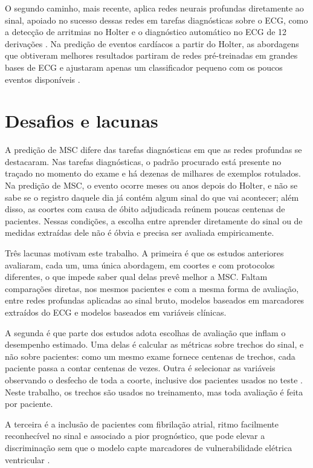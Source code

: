 O segundo caminho, mais recente, aplica redes neurais profundas diretamente
ao sinal, apoiado no sucesso dessas redes em tarefas diagnósticas sobre o
\gls{ECG}, como a detecção de arritmias no Holter
\cite{hannun2019cardiologist} e o diagnóstico automático no \gls{ECG} de 12
derivações \cite{ribeiro2020automatic}. Na predição de eventos cardíacos a
partir do Holter, as abordagens que obtiveram melhores resultados partiram
de redes pré-treinadas em grandes bases de \gls{ECG} e ajustaram apenas um
classificador pequeno com os poucos eventos disponíveis \cite{kim2025deep}.

\section{Desafios e lacunas}
\label{sec:intro-lacunas}

A predição de \gls{MSC} difere das tarefas diagnósticas em que as redes
profundas se destacaram. Nas tarefas diagnósticas, o padrão procurado está
presente no traçado no momento do exame e há dezenas de milhares de
exemplos rotulados. Na predição de \gls{MSC}, o evento ocorre meses ou anos
depois do Holter, e não se sabe se o registro daquele dia já contém algum
sinal do que vai acontecer; além disso, as coortes com causa de óbito
adjudicada reúnem poucas centenas de pacientes. Nessas condições, a escolha
entre aprender diretamente do sinal ou de medidas extraídas dele não é óbvia
e precisa ser avaliada empiricamente.

Três lacunas motivam este trabalho. A primeira é que os estudos anteriores
avaliaram, cada um, uma única abordagem, em coortes e com protocolos
diferentes, o que impede saber qual delas prevê melhor a \gls{MSC}. Faltam
comparações diretas, nos mesmos pacientes e com a mesma forma de avaliação,
entre redes profundas aplicadas ao sinal bruto, modelos baseados em
marcadores extraídos do \gls{ECG} e modelos baseados em variáveis clínicas.

A segunda é que parte dos estudos adota escolhas de avaliação que inflam o
desempenho estimado. Uma delas é calcular as métricas sobre trechos do
sinal, e não sobre pacientes: como um mesmo exame fornece centenas de
trechos, cada paciente passa a contar centenas de vezes. Outra é selecionar
as variáveis observando o desfecho de toda a coorte, inclusive dos pacientes
usados no teste \cite{kapoor2023leakage}. Neste trabalho, os trechos são
usados no treinamento, mas toda avaliação é feita por paciente.

A terceira é a inclusão de pacientes com fibrilação atrial, ritmo
facilmente reconhecível no sinal e associado a pior prognóstico, que pode
elevar a discriminação sem que o modelo capte marcadores de vulnerabilidade
elétrica ventricular \cite{swee2026multimodal}.


